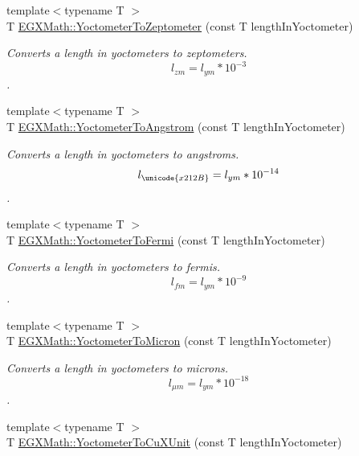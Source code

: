 \begin{DoxyCompactItemize}
{\footnotesize template$<$typename T $>$ }\\T \mbox{\hyperlink{group___e_g_x_math-_conversions-_length_conversions-_s_i-_yoctometer-_s_i_gab7c5e5b6659fb99614f1e47b8033ea85}{E\+G\+X\+Math\+::\+Yoctometer\+To\+Zeptometer}} (const T length\+In\+Yoctometer)
\begin{DoxyCompactList}\small\item\em Converts a length in yoctometers to zeptometers. \[ l_{zm}=l_{ym} * 10^{-3} \]. \end{DoxyCompactList}\item 
{\footnotesize template$<$typename T $>$ }\\T \mbox{\hyperlink{group___e_g_x_math-_conversions-_length_conversions-_s_i-_yoctometer-_non-_s_i_ga1189896c419175e90e23cea9d8f6b52a}{E\+G\+X\+Math\+::\+Yoctometer\+To\+Angstrom}} (const T length\+In\+Yoctometer)
\begin{DoxyCompactList}\small\item\em Converts a length in yoctometers to angstroms. \[ l_{\unicode{x212B}}=l_{ym} * 10^{-14} \]. \end{DoxyCompactList}\item 
{\footnotesize template$<$typename T $>$ }\\T \mbox{\hyperlink{group___e_g_x_math-_conversions-_length_conversions-_s_i-_yoctometer-_non-_s_i_gadcf3b93b00bf0d160f27d3a1a4b8ed9f}{E\+G\+X\+Math\+::\+Yoctometer\+To\+Fermi}} (const T length\+In\+Yoctometer)
\begin{DoxyCompactList}\small\item\em Converts a length in yoctometers to fermis. \[ l_{fm}=l_{ym} * 10^{-9} \]. \end{DoxyCompactList}\item 
{\footnotesize template$<$typename T $>$ }\\T \mbox{\hyperlink{group___e_g_x_math-_conversions-_length_conversions-_s_i-_yoctometer-_non-_s_i_ga4863fe4d5268ab023ec32d0281171b55}{E\+G\+X\+Math\+::\+Yoctometer\+To\+Micron}} (const T length\+In\+Yoctometer)
\begin{DoxyCompactList}\small\item\em Converts a length in yoctometers to microns. \[ l_{\mu m}=l_{ym} * 10^{-18} \]. \end{DoxyCompactList}\item 
{\footnotesize template$<$typename T $>$ }\\T \mbox{\hyperlink{group___e_g_x_math-_conversions-_length_conversions-_s_i-_yoctometer-_non-_s_i_ga0266faf325ea86fef13391fb6e792ff8}{E\+G\+X\+Math\+::\+Yoctometer\+To\+Cu\+X\+Unit}} (const T length\+In\+Yoctometer)

\end{DoxyCompactItemize}
